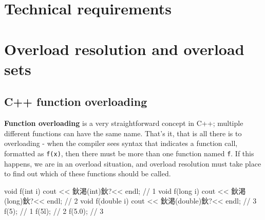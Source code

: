 \section{Technical requirements}


\section{Overload resolution and overload sets}


\subsection{C++ function overloading}

\textbf{Function overloading} is a very straightforward concept in C++; multiple different functions can have the same name. That's it, that is all there is to overloading - when the compiler sees syntax that indicates a function call, formatted as \texttt{f(x)}, then there must be more than one function named \texttt{f}. If this happens, we are in an overload situation, and overload resolution must take place to find out which of these functions should be called.


\begin{code}
void f(int i) { cout << 鈥渇(int)鈥?<< endl;  }        // 1
void f(long i) { cout << 鈥渇(long)鈥?<< endl;  }    // 2
void f(double i) { cout << 鈥渇(double)鈥?<< endl;  }    // 3
f(5);        // 1
f(5l);    // 2
f(5.0);    // 3

\end{code}

